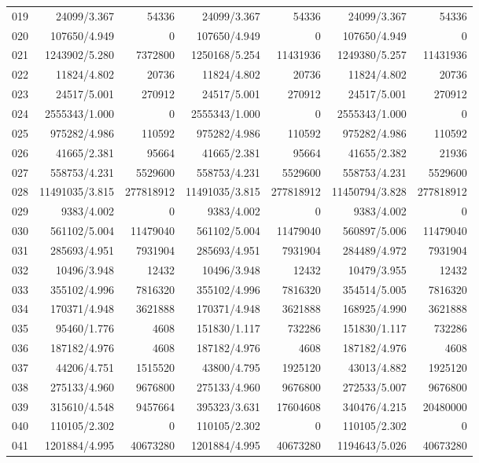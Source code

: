 \begin{longtable}{crrrrrr}
019 & 24099/3.367 & 54336 & 24099/3.367 & 54336 & 24099/3.367 & 54336 \\
020 & 107650/4.949 & 0 & 107650/4.949 & 0 & 107650/4.949 & 0 \\
021 & 1243902/5.280 & 7372800 & 1250168/5.254 & 11431936 & 1249380/5.257 & 11431936 \\
022 & 11824/4.802 & 20736 & 11824/4.802 & 20736 & 11824/4.802 & 20736 \\
023 & 24517/5.001 & 270912 & 24517/5.001 & 270912 & 24517/5.001 & 270912 \\
024 & 2555343/1.000 & 0 & 2555343/1.000 & 0 & 2555343/1.000 & 0 \\
025 & 975282/4.986 & 110592 & 975282/4.986 & 110592 & 975282/4.986 & 110592 \\
026 & 41665/2.381 & 95664 & 41665/2.381 & 95664 & 41655/2.382 & 21936 \\
027 & 558753/4.231 & 5529600 & 558753/4.231 & 5529600 & 558753/4.231 & 5529600 \\
028 & 11491035/3.815 & 277818912 & 11491035/3.815 & 277818912 & 11450794/3.828 & 277818912 \\
029 & 9383/4.002 & 0 & 9383/4.002 & 0 & 9383/4.002 & 0 \\
030 & 561102/5.004 & 11479040 & 561102/5.004 & 11479040 & 560897/5.006 & 11479040 \\
031 & 285693/4.951 & 7931904 & 285693/4.951 & 7931904 & 284489/4.972 & 7931904 \\
032 & 10496/3.948 & 12432 & 10496/3.948 & 12432 & 10479/3.955 & 12432 \\
033 & 355102/4.996 & 7816320 & 355102/4.996 & 7816320 & 354514/5.005 & 7816320 \\
034 & 170371/4.948 & 3621888 & 170371/4.948 & 3621888 & 168925/4.990 & 3621888 \\
035 & 95460/1.776 & 4608 & 151830/1.117 & 732286 & 151830/1.117 & 732286 \\
036 & 187182/4.976 & 4608 & 187182/4.976 & 4608 & 187182/4.976 & 4608 \\
037 & 44206/4.751 & 1515520 & 43800/4.795 & 1925120 & 43013/4.882 & 1925120 \\
038 & 275133/4.960 & 9676800 & 275133/4.960 & 9676800 & 272533/5.007 & 9676800 \\
039 & 315610/4.548 & 9457664 & 395323/3.631 & 17604608 & 340476/4.215 & 20480000 \\
040 & 110105/2.302 & 0 & 110105/2.302 & 0 & 110105/2.302 & 0 \\
041 & 1201884/4.995 & 40673280 & 1201884/4.995 & 40673280 & 1194643/5.026 & 40673280 \\

\end{longtable}
